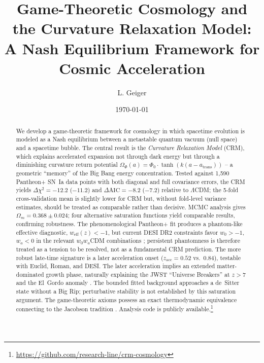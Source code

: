 \documentclass[aps,prd,twocolumn,superscriptaddress,nofootinbib]{revtex4-2}
\begin{document}

\title{Game-Theoretic Cosmology and the Curvature Relaxation Model: A Nash Equilibrium Framework for Cosmic Acceleration}

\author{L. Geiger}

\date{\today}

\begin{abstract}
We develop a game-theoretic framework for cosmology in which spacetime evolution is modeled as a Nash equilibrium between a metastable quantum vacuum (null space) and a spacetime bubble. The central result is the \textit{Curvature Relaxation Model} (CRM), which explains accelerated expansion not through dark energy but through a diminishing curvature return potential $\Omega_\Phi(a) = \Phi_0 \cdot \tanh(k(a - a_{\mathrm{trans}}))$ -- a geometric ``memory'' of the Big Bang energy concentration. Tested against 1,590 Pantheon+ SN~Ia data points \cite{Scolnic2022} with both diagonal and full covariance errors, the CRM yields $\Delta\chi^2 = -12.2$ ($-11.2$) and $\Delta\mathrm{AIC} = -8.2$ ($-7.2$) relative to $\Lambda$CDM; the 5-fold cross-validation mean is slightly lower for CRM but, without fold-level variance estimates, should be treated as comparable rather than decisive. MCMC analysis gives $\Omega_m = 0.368 \pm 0.024$; four alternative saturation functions yield comparable results, confirming robustness. The phenomenological Pantheon+ fit produces a phantom-like effective diagnostic, $w_{\mathrm{eff}}(z)<-1$, but current DESI DR2 constraints favor $w_0>-1$, $w_a<0$ in the relevant $w_0w_a$CDM combinations \cite{DESI2025}; persistent phantomness is therefore treated as a tension to be resolved, not as a fundamental CRM prediction. The more robust late-time signature is a later acceleration onset ($z_{\mathrm{acc}} = 0.52$ vs.\ $0.84$), testable with Euclid, Roman, and DESI. The later acceleration implies an extended matter-dominated growth phase, naturally explaining the JWST ``Universe Breakers'' at $z > 7$ \cite{Labbe2023} and the El~Gordo anomaly \cite{Asencio2023}. The bounded fitted background approaches a de~Sitter state without a Big Rip; perturbative stability is not established by this saturation argument. The game-theoretic axioms possess an exact thermodynamic equivalence connecting to the Jacobson tradition \cite{Jacobson1995}. Analysis code is publicly available.\footnote{\url{https://github.com/research-line/crm-cosmology}}
\end{abstract}
\end{document}
